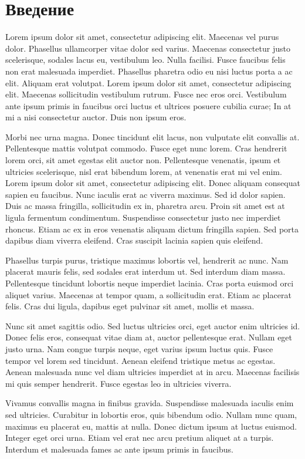 \chapter*{Введение}
Lorem ipsum dolor sit amet, consectetur adipiscing elit. Maecenas vel purus dolor. Phasellus ullamcorper vitae dolor sed varius. Maecenas consectetur justo scelerisque, sodales lacus eu, vestibulum leo. Nulla facilisi. Fusce faucibus felis non erat malesuada imperdiet. Phasellus pharetra odio eu nisi luctus porta a ac elit. Aliquam erat volutpat. Lorem ipsum dolor sit amet, consectetur adipiscing elit. Maecenas sollicitudin vestibulum rutrum. Fusce nec eros orci. Vestibulum ante ipsum primis in faucibus orci luctus et ultrices posuere cubilia curae; In at mi a nisi consectetur auctor. Duis non ipsum eros.

Morbi nec urna magna. Donec tincidunt elit lacus, non vulputate elit convallis at. Pellentesque mattis volutpat commodo. Fusce eget nunc lorem. Cras hendrerit lorem orci, sit amet egestas elit auctor non. Pellentesque venenatis, ipsum et ultricies scelerisque, nisl erat bibendum lorem, at venenatis erat mi vel enim. Lorem ipsum dolor sit amet, consectetur adipiscing elit. Donec aliquam consequat sapien eu faucibus. Nunc iaculis erat ac viverra maximus. Sed id dolor sapien. Duis ac massa fringilla, sollicitudin ex in, pharetra arcu. Proin sit amet est at ligula fermentum condimentum. Suspendisse consectetur justo nec imperdiet rhoncus. Etiam ac ex in eros venenatis aliquam dictum fringilla sapien. Sed porta dapibus diam viverra eleifend. Cras suscipit lacinia sapien quis eleifend.

Phasellus turpis purus, tristique maximus lobortis vel, hendrerit ac nunc. Nam placerat mauris felis, sed sodales erat interdum ut. Sed interdum diam massa. Pellentesque tincidunt lobortis neque imperdiet lacinia. Cras porta euismod orci aliquet varius. Maecenas at tempor quam, a sollicitudin erat. Etiam ac placerat felis. Cras dui ligula, dapibus eget pulvinar sit amet, mollis et massa.

Nunc sit amet sagittis odio. Sed luctus ultricies orci, eget auctor enim ultricies id. Donec felis eros, consequat vitae diam at, auctor pellentesque erat. Nullam eget justo urna. Nam congue turpis neque, eget varius ipsum luctus quis. Fusce tempor vel lorem sed tincidunt. Aenean eleifend tristique metus ac egestas. Aenean malesuada nunc vel diam ultricies imperdiet at in arcu. Maecenas facilisis mi quis semper hendrerit. Fusce egestas leo in ultricies viverra.

Vivamus convallis magna in finibus gravida. Suspendisse malesuada iaculis enim sed ultricies. Curabitur in lobortis eros, quis bibendum odio. Nullam nunc quam, maximus eu placerat eu, mattis at nulla. Donec dictum ipsum at luctus euismod. Integer eget orci urna. Etiam vel erat nec arcu pretium aliquet at a turpis. Interdum et malesuada fames ac ante ipsum primis in faucibus.

